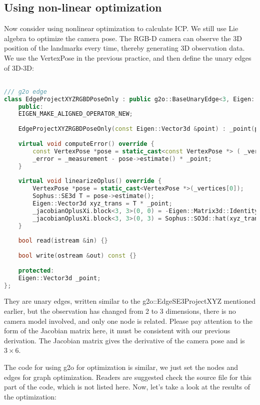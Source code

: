 \subsection{Using non-linear optimization}
Now consider using nonlinear optimization to calculate ICP. We still use Lie algebra to optimize the camera pose. The RGB-D camera can observe the 3D position of the landmarks every time, thereby generating 3D observation data. We use the VertexPose in the previous practice, and then define the unary edges of 3D-3D:
\begin{lstlisting}[language=c++,caption=slambook2/ch7/pose\_estimation\_3d3d.cpp]

/// g2o edge
class EdgeProjectXYZRGBDPoseOnly : public g2o::BaseUnaryEdge<3, Eigen::Vector3d, VertexPose> {
	public:
	EIGEN_MAKE_ALIGNED_OPERATOR_NEW;
	
	EdgeProjectXYZRGBDPoseOnly(const Eigen::Vector3d &point) : _point(point) {}
	
	virtual void computeError() override {
		const VertexPose *pose = static_cast<const VertexPose *> ( _vertices[0] );
		_error = _measurement - pose->estimate() * _point;
	}
	
	virtual void linearizeOplus() override {
		VertexPose *pose = static_cast<VertexPose *>(_vertices[0]);
		Sophus::SE3d T = pose->estimate();
		Eigen::Vector3d xyz_trans = T * _point;
		_jacobianOplusXi.block<3, 3>(0, 0) = -Eigen::Matrix3d::Identity();
		_jacobianOplusXi.block<3, 3>(0, 3) = Sophus::SO3d::hat(xyz_trans);
	}
	
	bool read(istream &in) {}
	
	bool write(ostream &out) const {}
	
	protected:
	Eigen::Vector3d _point;
};
\end{lstlisting}

They are unary edges, written similar to the g2o::EdgeSE3ProjectXYZ mentioned earlier, but the observation has changed from 2 to 3 dimensions, there is no camera model involved, and only one node is related. Please pay attention to the form of the Jacobian matrix here, it must be consistent with our previous derivation. The Jacobian matrix gives the derivative of the camera pose and is $3 \times 6$.

The code for using g2o for optimization is similar, we just set the nodes and edges for graph optimization. Readers are suggested check the source file for this part of the code, which is not listed here. Now, let’s take a look at the results of the optimization:

